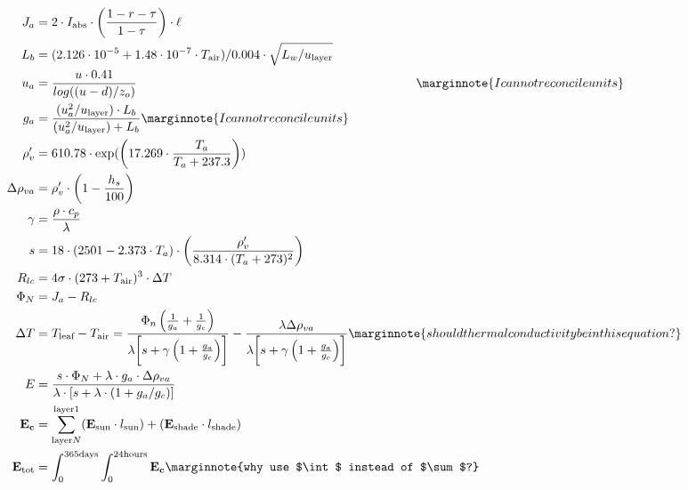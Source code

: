 \documentclass[24pt]{report}
\begin{document}
\begin{align}
 J_a &= 2 \cdot I_{\text{abs}} \cdot \left(\frac{1-r-\tau}{1-\tau}\right) \cdot \ell \label{eqn:Ja} \\
 L_b &= (2.126 \cdot 10^{-5} + 1.48 \cdot 10^{-7} \cdot T_\text{air}) / 0.004 \cdot \sqrt{L_w / u_{\text{layer}}} \label{eqn:Lb}\\
 u_a &= \frac{u \cdot 0.41}{log((u-d)/z_o)} \hspace{3.1in} \label{eqn:ua} \marginnote{I can not reconcile units}\\
 g_a &= \frac{(u_{a}^{2}/u_{\text{layer}}) \cdot L_b}{(u_{a}^{2}/u_{\text{layer}}) + L_b} \label{eqn:ga} \marginnote{I can not reconcile units}\\
 \rho_{v}^{\prime} &= 610.78 \cdot \exp(\left( 17.269 \cdot \frac{T_a}{T_a + 237.3} \right)) \label{eqn:rhop} \\
 \Delta \rho_{va} &= \rho_{v}^{\prime} \cdot \left( 1-\frac{h_s}{100} \right) \label{eqn:Deltarho} \\
 \gamma &= \frac{\rho \cdot c_p}{\lambda} \label{eqn:gamma} \\
 s &= 18 \cdot (2501 - 2.373 \cdot T_a) \cdot \left(\frac{\rho_{v}^{\prime}}{8.314 \cdot (T_a + 273)^2} \right) \label{eqn:s} \\
 R_{lc} &= 4 \sigma \cdot (273+T_{\text{air}})^3 \cdot \Delta T \label{eqn:Rlc} \\
 \Phi_N &= J_a - R_{lc} \label{eqn:PhiN} \\
 \Delta T &= T_{\text{leaf}} - T_{\text{air}} = \frac{\Phi_n \left(\frac{1}{g_a}+\frac{1}{g_c} \right)}{\lambda \biggl[ s+ \gamma \left( 1 + \frac{g_a}{g_c} \right) \biggr]} - \frac{\lambda \Delta \rho_{va}}{\lambda \biggl[ s+\gamma\left(1+\frac{g_a}{g_c}\right) \biggr] } \label{eqn:DeltaT} \marginnote{should thermal conductivity be in this equation?} \\
 E &= \frac{ s \cdot \Phi_N + \lambda \cdot g_a \cdot \Delta \rho_{va}}{\lambda \cdot [ s + \lambda \cdot (1+g_a / g_c)]} \label{eqn:E} \\
 \mathbf{E_c} &= \sum_{\text{layer} N}^{\text{layer} 1} (\mathbf{E_{\text{sun}}} \cdot l_{\text{sun}}) + (\mathbf{E_{\text{shade}}} \cdot l_{\text{shade}}) \label{eqn:Ec}\\ 
 \mathbf{E_{\text{tot}}} &= \int_0^{365\text{days}}\int_{0}^{24\text{hours}} \mathbf{E_c} \label{eqn:Etot} \marginnote{why use $\int$ instead of $\sum$?}
\end{align}
\end{document}
